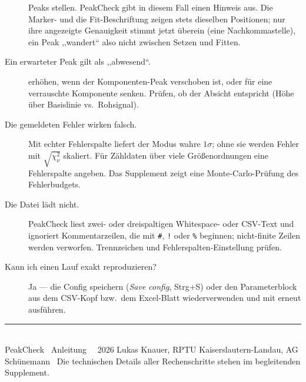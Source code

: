 \documentclass[11pt,a4paper]{article}
\begin{document}
\begin{description}
Peaks stellen. PeakCheck gibt in diesem Fall einen Hinweis aus. Die Marker- und
die Fit-Beschriftung zeigen stets dieselben Positionen; nur ihre angezeigte
Genauigkeit stimmt jetzt \"uberein (eine Nachkommastelle), ein Peak ,,wandert`` also
nicht zwischen Setzen und Fitten.
\item[Ein erwarteter Peak gilt als ,,abwesend``.]  erh\"ohen, wenn
der Komponenten-Peak verschoben ist, oder  f\"ur eine verrauschte
Komponente senken. Pr\"ufen, ob  der Absicht
entspricht (H\"ohe \"uber Basislinie vs.\ Rohsignal).
\item[Die gemeldeten Fehler wirken falsch.] Mit echter Fehlerspalte liefert der
Modus  wahre $1\sigma$; ohne sie werden Fehler mit
$\sqrt{\chi^2_\nu}$ skaliert. F\"ur Z\"ahldaten \"uber viele Gr\"o\ss enordnungen eine
Fehlerspalte angeben. Das Supplement zeigt eine Monte-Carlo-Pr\"ufung des
Fehlerbudgets.
\item[Die Datei l\"adt nicht.] PeakCheck liest zwei- oder dreispaltigen
Whitespace- oder CSV-Text und ignoriert Kommentarzeilen, die mit \texttt{\#},
\texttt{!} oder \texttt{\%} beginnen; nicht-finite Zeilen werden verworfen.
Trennzeichen und Fehlerspalten-Einstellung pr\"ufen.
\item[Kann ich einen Lauf exakt reproduzieren?] Ja --- die Config speichern
(\emph{Save config}, Strg+S) oder den Parameterblock aus dem CSV-Kopf bzw.\ dem
Excel-Blatt  wiederverwenden und mit  erneut
ausf\"uhren.
\end{description}

\noindent\rule{\linewidth}{0.4pt}\\[2pt]
{\footnotesize PeakCheck \textperiodcentered\ Anleitung \textperiodcentered\
\textcopyright\ 2026 Lukas Knauer, RPTU Kaiserslautern-Landau, AG Sch\"unemann
\textperiodcentered\ Die technischen Details aller Rechenschritte stehen im
begleitenden Supplement.}
\end{document}
